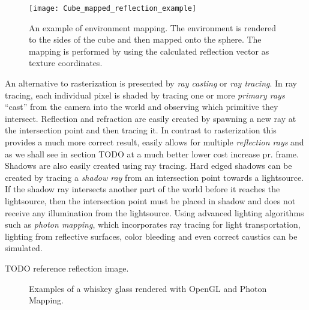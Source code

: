 \begin{figure}
  \centering
  \texttt{[image: Cube\_mapped\_reflection\_example]}
  \caption{An example of environment mapping. The environment is
    rendered to the sides of the cube and then mapped onto the sphere.
    The mapping is performed by using the calculated reflection vector
    as texture coordinates.}
  \label{fig:cubemap}
\end{figure}

An alternative to rasterization is presented by \textit{ray casting}
or \textit{ray tracing}. In ray tracing, each individual pixel is
shaded by tracing one or more \textit{primary rays} ``cast'' from the
camera into the world and observing which primitive they
intersect. Reflection and refraction are easily created by spawning a
new ray at the intersection point and then tracing it. In contrast to
rasterization this provides a much more correct result, easily allows
for multiple \textit{reflection rays} and as we shall see in section
TODO at a much better lower cost increase pr. frame. Shadows are also
easily created using ray tracing. Hard edged shadows can be created by
tracing a \textit{shadow ray} from an intersection point towards a
lightsource. If the shadow ray intersects another part of the world
before it reaches the lightsource, then the intersection point must be
placed in shadow and does not receive any illumination from the
lightsource. Using advanced lighting algorithms such as \textit{photon
  mapping}, which incorporates ray tracing for light transportation,
lighting from reflective surfaces, color bleeding and even correct
caustics can be simulated.

TODO reference reflection image.
\begin{figure}
  \centering


  \caption{Examples of a whiskey glass rendered with OpenGL and Photon
  Mapping.}
  \label{fig:caustics}
\end{figure}


